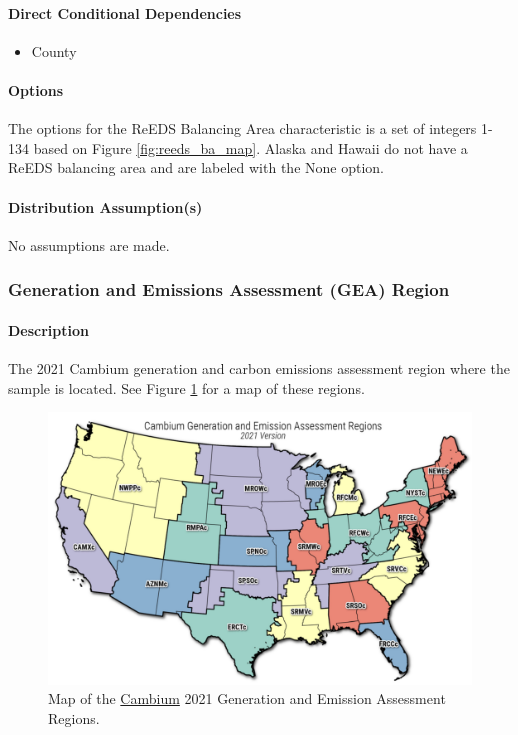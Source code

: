 \paragraph{Direct Conditional Dependencies}
\begin{itemize}
    \item County
\end{itemize}
\paragraph{Options}
The options for the ReEDS Balancing Area characteristic is a set of integers 1-134 based on Figure \ref{fig:reeds_ba_map}. Alaska and Hawaii do not have a ReEDS balancing area and are labeled with the None option.
\paragraph{Distribution Assumption(s)}
No assumptions are made.

\subsubsection{Generation and Emissions Assessment (GEA) Region}
\paragraph{Description}
The 2021 Cambium generation and carbon emissions assessment region where the sample is located. See Figure \ref{fig:cambium_gea_map} for a map of these regions.

\begin{figure}
    \centering
    \includegraphics[width=1\linewidth]{images/Cambium_GEAs_2021.png}
    \caption{ Map of the \href{https://www.nrel.gov/analysis/cambium.html}{Cambium} 2021 Generation and Emission Assessment Regions.}
    \label{fig:cambium_gea_map}
\end{figure}

